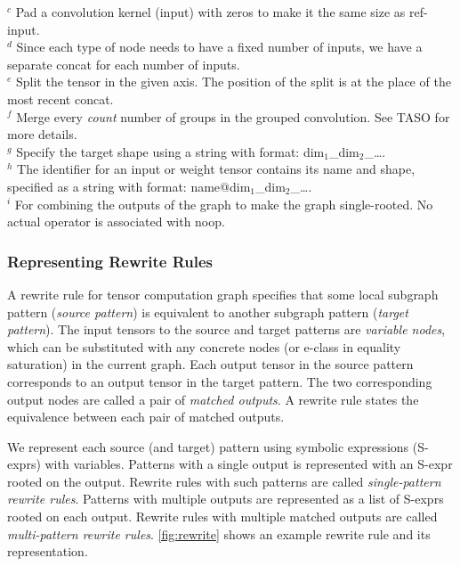 \begin{table}[t]
{    \footnotesize{$^c$ Pad a convolution kernel (input) with zeros to make it the same size as ref-input. }\\
    \footnotesize{$^d$ Since each type of node needs to have a fixed number of inputs, we have a separate concat for each number of inputs. }\\
    \footnotesize{$^e$ Split the tensor in the given axis. The position of the split is at the place of the most recent concat. }\\
    \footnotesize{$^f$ Merge every \textit{count} number of groups in the grouped convolution. See TASO \cite{taso} for more details. }\\
    \footnotesize{$^g$ Specify the target shape using a string with format: dim$_1$\_dim$_2$\_\dots .}\\
    \footnotesize{$^h$ The identifier for an input or weight tensor contains its name and shape, specified as a string with format: name@dim$_1$\_dim$_2$\_\dots .}\\
    \footnotesize{$^i$ For combining the outputs of the graph to make the graph single-rooted. No actual operator is associated with noop.}
  }
\end{table}


\subsubsection{Representing Rewrite Rules}
\label{sec:rewrite}

A rewrite rule for tensor computation graph specifies that some local subgraph pattern (\textit{source pattern}) is equivalent to another subgraph pattern (\textit{target pattern}).
The input tensors to the source and target patterns are \textit{variable nodes}, which can be substituted with any concrete nodes (or e-class in equality saturation) in the current graph.
Each output tensor in the source pattern corresponds to an output tensor in the target pattern.
The two corresponding output nodes are called a pair of \textit{matched outputs}.
A rewrite rule states the equivalence between each pair of matched outputs.

We represent each source (and target) pattern using symbolic expressions (S-exprs) with variables.
Patterns with a single output is represented with an S-expr rooted on the output.
Rewrite rules with such patterns are called \textit{single-pattern rewrite rules}.
Patterns with multiple outputs are represented as a list of S-exprs rooted on each output.
Rewrite rules with multiple matched outputs are called \textit{multi-pattern rewrite rules}.
\autoref{fig:rewrite} shows an example rewrite rule and its representation.

